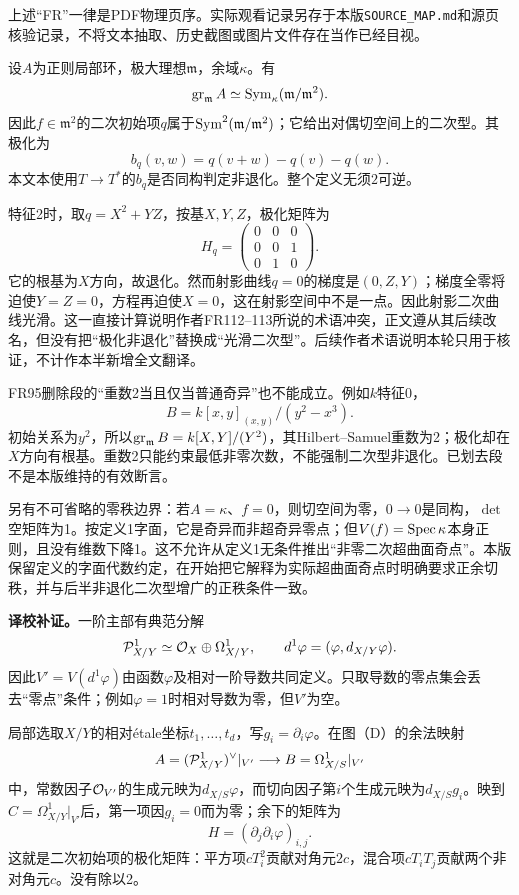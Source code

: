 上述“FR”一律是PDF物理页序。实际观看记录另存于本版\texttt{SOURCE\_MAP.md}和源页核验记录，不将文本抽取、历史截图或图片文件存在当作已经目视。

设$A$为正则局部环，极大理想$\mathfrak m$，余域$\kappa$。有
\[
 \operatorname{gr}_{\mathfrak m}A\simeq\operatorname{Sym}_{\kappa}(\mathfrak m/\mathfrak m^2).
\]
因此$f\in\mathfrak m^2$的二次初始项$q$属于$\operatorname{Sym}^2(\mathfrak m/\mathfrak m^2)$；它给出对偶切空间上的二次型。其极化为
\[
 b_q(v,w)=q(v+w)-q(v)-q(w).
\]
本文本使用$T\to T^*$的$b_q$是否同构判定非退化。整个定义无须$2$可逆。

特征2时，取$q=X^2+YZ$，按基$X,Y,Z$，极化矩阵为
\[
 H_q=\begin{pmatrix}0&0&0\\0&0&1\\0&1&0\end{pmatrix}.
\]
它的根基为$X$方向，故退化。然而射影曲线$q=0$的梯度是$(0,Z,Y)$；梯度全零将迫使$Y=Z=0$，方程再迫使$X=0$，这在射影空间中不是一点。因此射影二次曲线光滑。这一直接计算说明作者FR112--113所说的术语冲突，正文遵从其后续改名，但没有把“极化非退化”替换成“光滑二次型”。后续作者术语说明本轮只用于核证，不计作本半新增全文翻译。

FR95删除段的“重数2当且仅当普通奇异”也不能成立。例如$k$特征0，
\[
 B=k[x,y]_{(x,y)}/(y^2-x^3).
\]
初始关系为$y^2$，所以$\operatorname{gr}_{\mathfrak m}B=k[X,Y]/(Y^2)$，其Hilbert--Samuel重数为2；极化却在$X$方向有根基。重数2只能约束最低非零次数，不能强制二次型非退化。已划去段不是本版维持的有效断言。

另有不可省略的零秩边界：若$A=\kappa$、$f=0$，则切空间为零，$0\to0$是同构，$\det$空矩阵为1。按定义1字面，它是奇异而非超奇异零点；但$V(f)=\operatorname{Spec}\kappa$本身正则，且没有维数下降1。这不允许从定义1无条件推出“非零二次超曲面奇点”。本版保留定义的字面代数约定，在开始把它解释为实际超曲面奇点时明确要求正余切秩，并与后半非退化二次型增广的正秩条件一致。

\noindent\textbf{译校补证。}一阶主部有典范分解
\[
 \mathcal P^1_{X/Y}\simeq\mathcal O_X\oplus\Omega^1_{X/Y},
 \qquad d^1\varphi=(\varphi,d_{X/Y}\varphi).
\]
因此$V'=V(d^1\varphi)$由函数$\varphi$及相对一阶导数共同定义。只取导数的零点集会丢去“零点”条件；例如$\varphi=1$时相对导数为零，但$V'$为空。

局部选取$X/Y$的相对étale坐标$t_1,\ldots,t_d$，写$g_i=\partial_i\varphi$。在图（D）的余法映射
\[
 A=(\mathcal P^1_{X/Y})^\vee|_{V'}
 \longrightarrow B=\Omega^1_{X/S}|_{V'}
\]
中，常数因子$\mathcal O_{V'}$的生成元映为$d_{X/S}\varphi$，而切向因子第$i$个生成元映为$d_{X/S}g_i$。映到$C=\Omega^1_{X/Y}|_{V'}$后，第一项因$g_i=0$而为零；余下的矩阵为
\[
 H=(\partial_j\partial_i\varphi)_{i,j}.
\]
这就是二次初始项的极化矩阵：平方项$cT_i^2$贡献对角元$2c$，混合项$cT_iT_j$贡献两个非对角元$c$。没有除以2。

